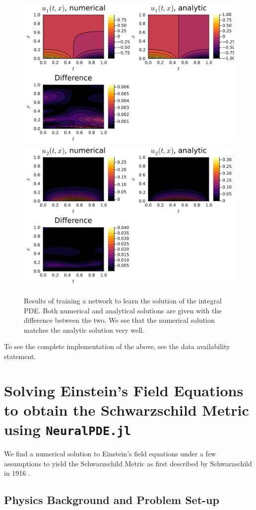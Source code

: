 \documentclass{CUP-JNL-DTM}%
\theoremstyle{definition}
\numberwithin{equation}{section}
\begin{document}
\begin{figure}[]
\centering
    \includegraphics[width=0.48\linewidth]{figures/integral_PDE_plots/plot_u1.png}
    \includegraphics[width=0.48\linewidth]{figures/integral_PDE_plots/plot_u2.png}
    \caption{Results of training a network to learn the solution of the integral PDE. Both numerical and analytical solutions are given with the difference between the two. We see that the numerical solution matches the analytic solution very well.}
    \label{fig:integro_results}
\end{figure}

To see the complete implementation of the above, see the data availability statement. 


\section{Solving Einstein's Field Equations to obtain the Schwarzschild Metric using \texttt{NeuralPDE.jl}}

We find a numerical solution to Einstein's field equations under a few assumptions to yield the Schwarzschild Metric as first described by Schwarzschild in 1916 \cite{schwarzschildGravitationalFieldMass1999}. 

\subsection{Physics Background and Problem Set-up}
\end{document}
